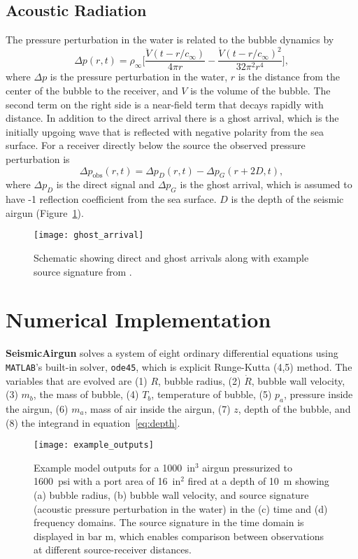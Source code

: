 \documentclass[10pt]{article}
\begin{document}
\subsection{Acoustic Radiation}
The pressure perturbation in the water is related to the bubble dynamics by \citep{Keller1956}
\begin{equation}
\Delta p(r,t) = \rho_\infty \bigg[ \frac{\ddot{V}(t-r/c_\infty)}{4\pi r} - \frac{\dot{V}(t-r/c_\infty)^2}{32\pi^2r^4} \bigg],
\label{eq:acoustic radiation}
\end{equation}
where $\Delta p$ is the pressure perturbation in the water, $r$ is the distance from the center of the bubble to the receiver, and $V$ is the volume of the bubble. The second term on the right side is a near-field term that decays rapidly with distance. In addition to the direct arrival there is a ghost arrival, which is the initially upgoing wave that is reflected with negative polarity from the sea surface. For a receiver directly below the source the observed pressure perturbation is
\begin{equation}
\Delta p_\text{obs}(r,t) = \Delta p_D(r,t) - \Delta p_G(r+2D,t),
\end{equation}
where $\Delta p_D$ is the direct signal and $\Delta p_G$ is the ghost arrival, which is assumed to have -1 reflection coefficient from the sea surface. $D$ is the depth of the seismic airgun (Figure~\ref{fig:ghost}).

\begin{figure}[h!]
\centering
\texttt{[image: ghost\_arrival]}
\caption{Schematic showing direct and ghost arrivals along with example source signature from \citet{Watson2016}.}
\label{fig:ghost}
\end{figure}

\section{Numerical Implementation}
{\bf SeismicAirgun} solves a system of eight ordinary differential equations using \texttt{MATLAB}'s built-in solver, \texttt{ode45}, which is explicit Runge-Kutta (4,5) method. The variables that are evolved are (1) $R$, bubble radius, (2) $\dot{R}$, bubble wall velocity, (3) $m_b$, the mass of bubble, (4) $T_b$, temperature of bubble, (5) $p_a$, pressure inside the airgun, (6) $m_a$, mass of air inside the airgun, (7) $z$, depth of the bubble, and (8) the integrand in equation~\ref{eq:depth}.

\begin{figure}[b!]
\centering
\texttt{[image: example\_outputs]}
\caption{Example model outputs for a 1000~in$^3$ airgun pressurized to 1600~psi with a port area of 16~in$^2$ fired at a depth of 10~m showing (a) bubble radius, (b) bubble wall velocity, and source signature (acoustic pressure perturbation in the water) in the (c) time and (d) frequency domains. The source signature in the time domain is displayed in bar m, which enables comparison between observations at different source-receiver distances.}
\label{fig:example outputs}
\end{figure}
\end{document}
